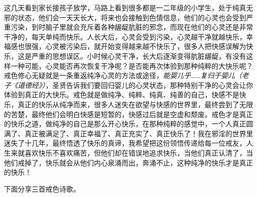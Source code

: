 这几天看到家长接孩子放学，马路上看到很多都是一二年级的小学生，处于纯真无邪的状态，他们会一天天长大，将来也会接触到色情信息，他们的心灵也会受到严重污染，到时脑子里就会充斥着各种龌龊肮脏的邪念，而现在他们的心灵还是非常干净的，每天单纯而快乐。人长大后，心灵会受到污染，心灵越干净就越快乐，幸福感也很强，心灵被污染后，就开始变得越来越不快乐了，很多人把快感误解为快乐，这是严重的思想误区。小时候心灵干净，长大后逐渐变得肮脏龌龊，有没有这样一种可能，心灵能否再次恢复干净呢？是否能再次体验到那种纯粹的大快乐呢？戒色修心无疑就是一条重返纯净心灵的方法或途径，\textit{能婴儿乎……复归于婴儿（老子《道德经》）}，圣贤告诉我们要回归婴儿的心灵状态，那种特别干净的心灵会让你体验到真正的大快乐。戒色就是做纯净、纯粹、纯真、纯善的自己，快感不是快乐，真正的快乐从纯净而来，很多人迷失在欲望与快感的世界里，最终尝到了无限的苦楚，最终他们会明白快感是短暂的，快感过后就是空虚和颓废。戒色才是真正的快乐之道，做纯净的自己是那么开心快乐，在那种纯粹的感觉中，一个人真正圆满了、真正被满足了、真正幸福了、真正充实了、真正快乐了！我在邪淫的世界里迷失了十几年，最终悟透了快乐的真谛，我希望把这份领悟传递给每一位戒友，人生来就喜欢快乐不喜欢痛苦，但他们却在错误地追求快乐，当他们真正认清了，当他们戒掉了，快乐就会从他们内心泉涌而出，奔涌不止，这种纯净的快乐才是真正的快乐！

下面分享三首戒色诗歌。

